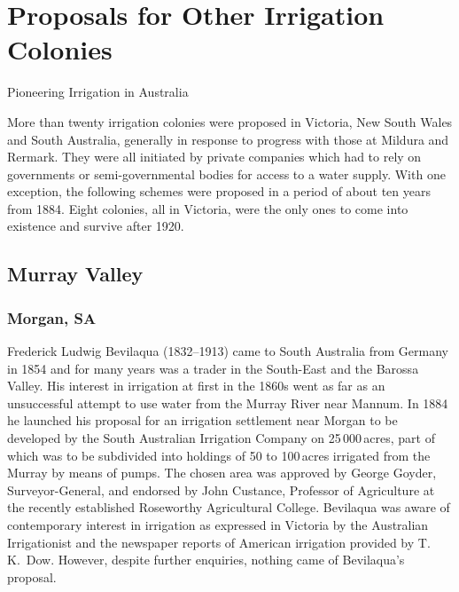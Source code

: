 
\setcounter{endnote}{0}

\chapter{Proposals for Other Irrigation Colonies}
\label{ch:proposals}
%
{Pioneering Irrigation in Australia}

More than twenty irrigation colonies were proposed in Victoria, New
South Wales and South Australia, generally in response to progress
with those at Mildura and Rermark.  They were all initiated by private
companies which had to rely on governments or semi-governmental bodies
for access to a water supply. With one exception, the following
schemes were proposed in a period of about ten years from 1884.  Eight
colonies, all in Victoria, were the only ones to come into existence
and survive after 1920.

\section*{Murray Valley}

\subsection*{Morgan, SA} 

Frederick Ludwig Bevilaqua (1832--1913)  came
to South Australia from Germany in 1854 and for many years was a
trader in the South-East and the Barossa
Valley.  His interest in irrigation at first in
the 1860s went as far as an unsuccessful attempt to use water from the
Murray River  near Mannum.  In
1884 he launched his proposal for an irrigation settlement near Morgan
to be developed by the South Australian Irrigation Company  on 25\,000\,acres, part of which was to be subdivided
into holdings of 50 to 100\,acres irrigated from the Murray by means
of pumps.  The chosen area was approved by George Goyder,
Surveyor-General,   and endorsed by John Custance,
 Professor of Agriculture at the recently
established Roseworthy Agricultural College.  Bevilaqua was aware of contemporary interest in
irrigation as expressed in Victoria by the Australian Irrigationist
and the newspaper reports of American irrigation provided by
T.\,K.~Dow.  However, despite further enquiries,
nothing came of Bevilaqua's proposal.

